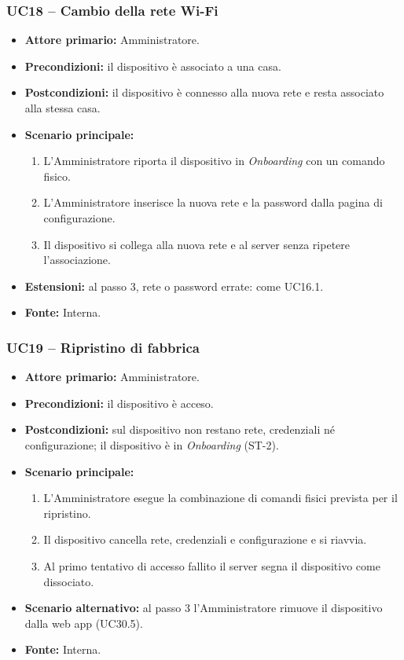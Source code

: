\documentclass[12pt,a4paper]{article}
\newcommand{\tightlist}{\setlength{\itemsep}{1pt}\setlength{\parskip}{0pt}}
\begin{document}
\subsubsection{UC18 -- Cambio della rete Wi-Fi}
\begin{itemize}
\tightlist
\item \textbf{Attore primario:} Amministratore.
\item \textbf{Precondizioni:} il dispositivo è associato a una casa.
\item \textbf{Postcondizioni:} il dispositivo è connesso alla nuova rete e resta associato alla stessa casa.
\item \textbf{Scenario principale:}
\begin{enumerate}
\tightlist
\item L'Amministratore riporta il dispositivo in \emph{Onboarding} con un comando fisico.
\item L'Amministratore inserisce la nuova rete e la password dalla pagina di configurazione.
\item Il dispositivo si collega alla nuova rete e al server senza ripetere l'associazione.
\end{enumerate}
\item \textbf{Estensioni:} al passo 3, rete o password errate: come UC16.1.
\item \textbf{Fonte:} Interna.
\end{itemize}

\subsubsection{UC19 -- Ripristino di fabbrica}
\begin{itemize}
\tightlist
\item \textbf{Attore primario:} Amministratore.
\item \textbf{Precondizioni:} il dispositivo è acceso.
\item \textbf{Postcondizioni:} sul dispositivo non restano rete, credenziali né configurazione; il dispositivo è in \emph{Onboarding} (ST-2).
\item \textbf{Scenario principale:}
\begin{enumerate}
\tightlist
\item L'Amministratore esegue la combinazione di comandi fisici prevista per il ripristino.
\item Il dispositivo cancella rete, credenziali e configurazione e si riavvia.
\item Al primo tentativo di accesso fallito il server segna il dispositivo come dissociato.
\end{enumerate}
\item \textbf{Scenario alternativo:} al passo 3 l'Amministratore rimuove il dispositivo dalla web app (UC30.5).
\item \textbf{Fonte:} Interna.
\end{itemize}
\end{document}
